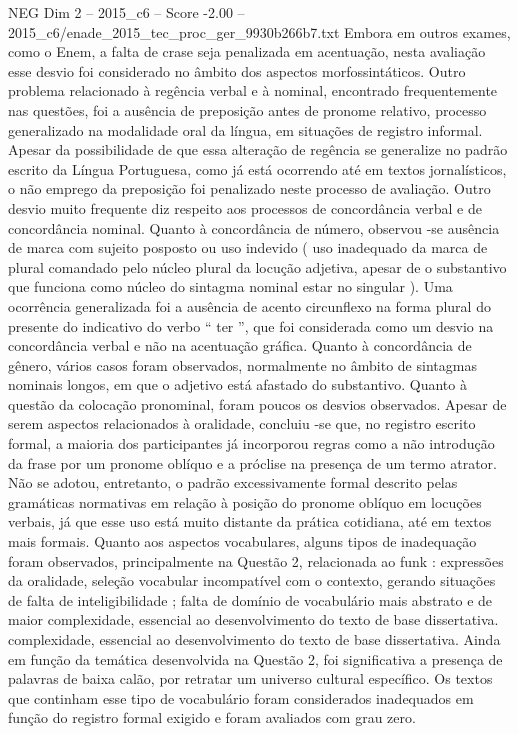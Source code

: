 \begin{textsample}{NEG Dim 2 – 2015\_c6 – Score -2.00 – 2015\_c6/enade\_2015\_tec\_proc\_ger\_9930b266b7.txt}
Embora em outros exames, como o Enem, a falta de crase seja penalizada em acentuação, nesta avaliação esse desvio foi considerado no âmbito dos aspectos morfossintáticos.
Outro problema relacionado à regência verbal e à nominal, encontrado frequentemente nas questões, foi a ausência de preposição antes de pronome relativo, processo generalizado na modalidade oral da língua, em situações de registro informal.
Apesar da possibilidade de que essa alteração de regência se generalize no padrão escrito da Língua Portuguesa, como já está ocorrendo até em textos jornalísticos, o não emprego da preposição foi penalizado neste processo de avaliação.
Outro desvio muito frequente diz respeito aos processos de concordância verbal e de concordância nominal.
Quanto à concordância de número, observou -se ausência de marca com sujeito posposto ou uso indevido ( uso inadequado da marca de plural comandado pelo núcleo plural da locução adjetiva, apesar de o substantivo que funciona como núcleo do sintagma nominal estar no singular ).
Uma ocorrência generalizada foi a ausência de acento circunflexo na forma plural do presente do indicativo do verbo “ ter ”, que foi considerada como um desvio na concordância verbal e não na acentuação gráfica.
Quanto à concordância de gênero, vários casos foram observados, normalmente no âmbito de sintagmas nominais longos, em que o adjetivo está afastado do substantivo.
Quanto à questão da colocação pronominal, foram poucos os desvios observados.
Apesar de serem aspectos relacionados à oralidade, concluiu -se que, no registro escrito formal, a maioria dos participantes já incorporou regras como a não introdução da frase por um pronome oblíquo e a próclise na presença de um termo atrator.
Não se adotou, entretanto, o padrão excessivamente formal descrito pelas gramáticas normativas em relação à posição do pronome oblíquo em locuções verbais, já que esse uso está muito distante da prática cotidiana, até em textos mais formais.
Quanto aos aspectos vocabulares, alguns tipos de inadequação foram observados, principalmente na Questão 2, relacionada ao funk : expressões da oralidade, seleção vocabular incompatível com o contexto, gerando situações de falta de inteligibilidade ; falta de domínio de vocabulário mais abstrato e de maior complexidade, essencial ao desenvolvimento do texto de base dissertativa. complexidade, essencial ao desenvolvimento do texto de base dissertativa.
Ainda em função da temática desenvolvida na Questão 2, foi significativa a presença de palavras de baixa calão, por retratar um universo cultural específico.
Os textos que continham esse tipo de vocabulário foram considerados inadequados em função do registro formal exigido e foram avaliados com grau zero.

\end{textsample}
